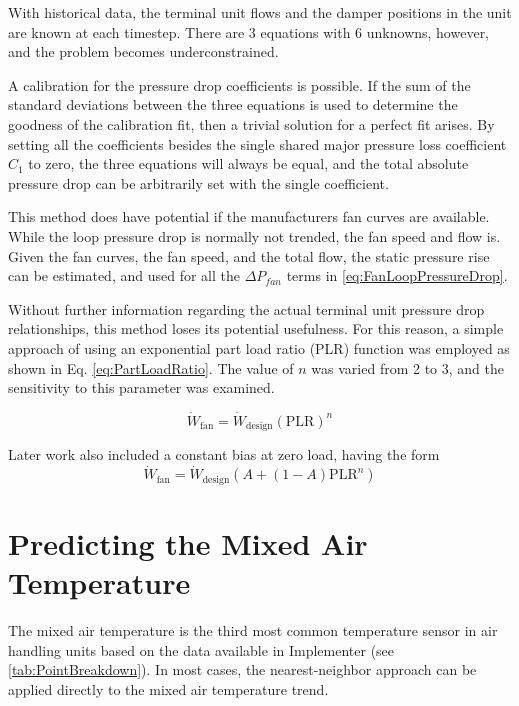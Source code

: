 With historical data, the terminal unit flows and the
damper positions in the unit are known at each timestep. There are 3 equations with 6
unknowns, however, and the problem becomes underconstrained.

A calibration for the pressure drop coefficients is possible. If the sum
of the standard deviations between the three equations is used to
determine the goodness of the calibration fit, then a trivial solution
for a perfect fit arises. By setting all the coefficients besides the
single shared major pressure loss coefficient \(C_1\) to zero, the three
equations will always be equal, and the total absolute pressure drop can
be arbitrarily set with the single coefficient.

This method does have potential if the manufacturers fan curves are
available. While the loop pressure drop is normally not trended, the fan
speed and flow is. Given the fan curves, the fan speed, and the total
flow, the static pressure rise can be estimated, and used for all the
\(\Delta P_{fan} \) terms in  \ref{eq:FanLoopPressureDrop}.

Without further information regarding the actual terminal unit pressure
drop relationships, this method loses its potential usefulness. For this
reason, a simple approach of using an exponential part load ratio (PLR)
function was employed as shown in Eq. \ref{eq:PartLoadRatio}. The value
of \(n\) was varied from 2 to 3, and the sensitivity to this parameter was
examined.


\begin{equation}\label{eq:PartLoadRatio}
    \dot{W}_{\text{fan}} = \dot{W}_{\text{design}} \left(\text{PLR}\right)^n
\end{equation}

Later work also included a constant bias at zero load, having the form
\begin{equation}
    \dot{W}_{\text{fan}} = \dot{W}_{\text{design}} \left(A +
    \left(1-A\right)\text{PLR}^{n}\right)
\end{equation}

\section{Predicting the Mixed Air Temperature}

The mixed air temperature is the third most common temperature sensor in
air handling units based on the data available in Implementer
(see \tableref{} \ref{tab:PointBreakdown}). In most cases, the nearest-neighbor
approach can be applied directly to the mixed air temperature trend.

